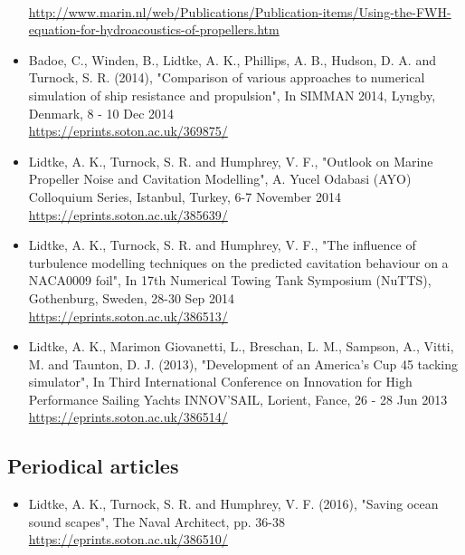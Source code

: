 \documentclass[a4paper,10pt]{article}
\begin{document}
\begin{itemize}
	\\ \url{http://www.marin.nl/web/Publications/Publication-items/Using-the-FWH-equation-for-hydroacoustics-of-propellers.htm}
%
\item Badoe, C., Winden, B., Lidtke, A. K., Phillips, A. B., Hudson, D. A. and
	Turnock, S. R. (2014), "Comparison of various approaches to numerical simulation
	of ship resistance and propulsion", In SIMMAN 2014, Lyngby, Denmark, 8 - 10 Dec 2014
	\cite{Badoe2014}
	\\ \url{https://eprints.soton.ac.uk/369875/}
%
\item Lidtke, A. K., Turnock, S. R. and Humphrey, V. F., "Outlook on Marine Propeller
	Noise and Cavitation Modelling", A. Yucel Odabasi (AYO) Colloquium Series, Istanbul,
	Turkey, 6-7 November 2014
	\cite{Lidtke2014a}
	\\ \url{https://eprints.soton.ac.uk/385639/}
%
\item Lidtke, A. K., Turnock, S. R. and Humphrey, V. F., "The influence of turbulence
	modelling techniques on the predicted cavitation behaviour on a NACA0009 foil",
	In 17th Numerical Towing Tank Symposium (NuTTS), Gothenburg, Sweden, 28-30 Sep 2014
	\cite{Lidtke2014}
	\\ \url{https://eprints.soton.ac.uk/386513/}
%
\item Lidtke, A. K., Marimon Giovanetti, L., Breschan, L. M., Sampson, A., Vitti, M.
	and Taunton, D. J. (2013), "Development of an America's Cup 45 tacking simulator",
	In Third International Conference on Innovation for High Performance Sailing
	Yachts INNOV’SAIL, Lorient, Fance, 26 - 28 Jun 2013
	\cite{Lidtke2013}
	\\ \url{https://eprints.soton.ac.uk/386514/}
%
\end{itemize}

\subsection{Periodical articles}
%
\begin{itemize}
\item Lidtke, A. K., Turnock, S. R. and Humphrey, V. F. (2016), "Saving ocean sound
	scapes", The Naval Architect, pp. 36-38
	\cite{Lidtke2016c}
	\\ \url{https://eprints.soton.ac.uk/386510/}
%
\end{itemize}

\end{document}
